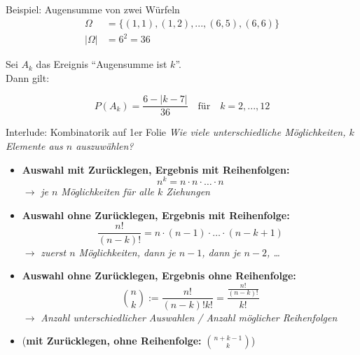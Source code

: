\documentclass[
  10pt,
  ignorenonframetext,
]{beamer}
\begin{document}
\begin{frame}{Beispiel: Augensumme von zwei Würfeln}
\protect\hypertarget{beispiel-augensumme-von-zwei-wuxfcrfeln}{}
\begin{align*}
\Omega &= \{(1, 1), (1, 2), ..., (6, 5), (6,6)\} \\
|\Omega| &= 6^2 =  36
\end{align*}

Sei \(A_k\) das Ereignis ``Augensumme ist \(k\)''.\\
Dann gilt:

\[P(A_k) = \frac{6 - |k - 7|}{36}\quad\mbox{für}\quad k=2,...,12\]

\end{frame}

\begin{frame}{Interlude: Kombinatorik auf 1er Folie}
\protect\hypertarget{interlude-kombinatorik-auf-1er-folie}{}
\emph{Wie viele unterschiedliche Möglichkeiten, \(k\) Elemente aus \(n\)
auszuwählen?}

\begin{itemize}
\item \textbf{Auswahl mit Zurücklegen, Ergebnis mit Reihenfolgen:} $$n^k = n \cdot n \cdot \dots \cdot n$$
   $\to$ \emph{je $n$ Möglichkeiten für alle $k$ Ziehungen}
\item \textbf{Auswahl ohne Zurücklegen, Ergebnis mit Reihenfolge:}
        $$\frac{n!}{(n-k)!} = n \cdot (n-1) \cdot \ldots \cdot (n-k+1)$$
   $\to$ \emph{zuerst $n$ Möglichkeiten, dann je $n-1$, dann je $n-2$, \dots}
\item \textbf{Auswahl ohne Zurücklegen, Ergebnis ohne Reihenfolge:}
     $$\binom{n}{k} := \frac{n!}{(n-k)!k!} = \frac{\frac{n!}{(n-k)!}}{k!}$$
   $\to$ \emph{Anzahl unterschiedlicher Auswahlen / Anzahl möglicher Reihenfolgen}
\item (\textbf{mit Zurücklegen, ohne Reihenfolge:} $\binom{n+k-1}{k}$) 
\end{itemize}
\end{frame}
\end{document}
